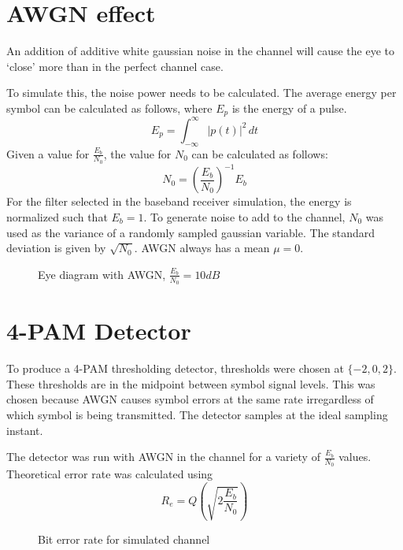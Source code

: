 \documentclass[11pt]{article}
\begin{document}
\section{AWGN effect}
An addition of additive white gaussian noise in the channel will cause the eye
to `close' more than in the perfect channel case.

To simulate this, the noise power needs to be calculated. The average energy per
symbol can be calculated as follows, where $E_p$ is the energy of a pulse.
\begin{equation}
    E_p = \int_{-\infty}^{\infty} |p(t)|^2 \,dt
\end{equation}
Given a value for $\frac{E_b}{N_0}$, the value for $N_0$ can be calculated as
follows:
\begin{equation}
    N_0 = \left(\frac{E_b}{N_0} \right)^{-1} E_b
\end{equation}
For the filter selected in the baseband receiver simulation, the energy is
normalized such that $E_b = 1$. To generate noise to add to the channel, $N_0$
was used as the variance of a randomly sampled gaussian variable. The standard
deviation is given by $\sqrt{N_0}$. AWGN always has a mean $\mu = 0$.

\begin{figure}[H]
    \centering
    \scalebox{0.7}{}
    \caption{Eye diagram with AWGN, $\frac{E_b}{N_0} = 10dB$}
\end{figure}

\section{4-PAM Detector}
To produce a 4-PAM thresholding detector, thresholds were chosen at $\{-2, 0,
    2\}$. These thresholds are in the midpoint between symbol signal levels.
This was chosen because AWGN causes symbol errors at the same rate irregardless
of which symbol is being transmitted. The detector samples at the ideal sampling
instant.


The detector was run with AWGN in the channel for a variety of $\frac{E_b}{N_0}$
values. Theoretical error rate was calculated using
\begin{equation}
    R_e = Q\left( \sqrt{2 \frac{E_b}{N_0}}\right)
\end{equation}

\begin{figure}[H]
    \centering
    \scalebox{0.7}{}
    \caption{Bit error rate for simulated channel\label{error}}
\end{figure}
\end{document}
